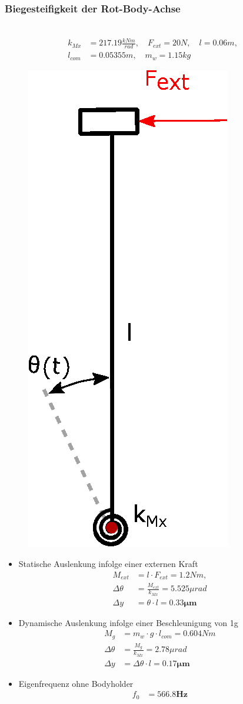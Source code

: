 \documentclass[10pt,a4paper]{iace.report}
\begin{document}
                 \subsubsection{Biegesteifigkeit der Rot-Body-Achse}\leavevmode\\
	                \begin{align*}
	                	k_{Mx} &= 217.19\frac{kNm}{rad}, \quad F_{ext}=20N, \quad l=0.06m, \\ l_{com}&=0.05355m, \quad m_w=1.15kg
	                \end{align*}
	                \begin{figure}[!h]
	                	\centering
	                	\includegraphics[width=0.2\linewidth]{./pics/rotBody.eps}
	                \end{figure}
	                \begin{itemize}
	                	\item Statische Auslenkung infolge einer externen Kraft\\
	                	\begin{align*}
	                	M_{ext} &= l\cdot F_{ext} = 1.2Nm,\\ 
	                	\Delta\theta &= \frac{M_{ext}}{k_{Mx}} = 5.525\mu rad\\
	                	\Delta y &= \theta\cdot l=\bm{0.33\mu m}      
	                	\end{align*}
	                	\item Dynamische Auslenkung infolge einer Beschleunigung von 1g
	                	\begin{align*}
	                	M_g &=m_w\cdot g \cdot l_{com}= 0.604 Nm\\ 
	                	\Delta\theta &= \frac{M_{g}}{k_{Mx}} = 2.78\mu rad\\
	                	\Delta y&=\Delta\theta\cdot l=\bm{0.17 \mu m}
	                	\end{align*}
	                	\item Eigenfrequenz ohne Bodyholder \\
	                	\begin{align*}
	                		f_{0} &= \bm{566.8 Hz}
	                	\end{align*}
	                \end{itemize}
\end{document}
